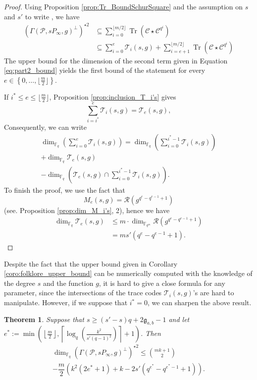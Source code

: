 \documentclass[journal]{IEEEtran}
\theoremstyle{plain}
\newtheorem{thm}{Theorem}[section]
\theoremstyle{definition}
\theoremstyle{remark}
\DeclareMathOperator{\trace}{Tr}
\newcommand{\calP}{\mathcal{P}}
\newcommand{\calC}{\mathcal{C}}
\newcommand{\calR}{\mathcal{R}}
\newcommand{\calT}{\mathcal{T}}
\newcommand{\fqm}{\mathbb{F}_{q^m}}
\newcommand{\fq}{\mathbb{F}_{q}}
\newcommand{\Tr}[1]{\trace\!\left(#1\right)}
\newcommand{\set}[1]{\left\{#1\right\}}
\begin{document}
	\begin{proof}
		Using Proposition \ref{prop:Tr_BoundSchurSquare} and the assumption on $s$ and $s'$ to write , we have
		\begin{align*}
			\left(\Gamma(\calP,sP_\infty,g)^{\perp}\right)^{\star 2}
			& \subseteq \sum\limits_{i=0}^{\lfloor m/2 \rfloor} \Tr{\calC \star                     \calC^{q^i}} \\
			& \subseteq \sum\limits_{i=0}^{e}\calT_i(s,g) + \sum\limits_{i=e+1}^{\lfloor m/2 \rfloor} \Tr{\calC \star \calC^{q^i}}
		\end{align*}
		The upper bound for the dimension of the second term given in Equation \eqref{eq:part2_bound} yields the first bound of the statement for every $e \in \set{0,\dots,\lfloor \frac{m}{2} \rfloor}$.
		
		\medskip
		
		If $i^* \leq e \leq \lfloor \frac{m}{2} \rfloor$,  Proposition \ref{prop:inclusion_T_i's} gives
		\[\sum\limits_{i=i^*}^e \calT_i(s,g) = \calT_e(s,g),\]
		Consequently, we can write 
		\begin{multline}
		\dim_{\fq} \left(\sum\limits_{i=0}^{e}\calT_i(s,g)\right) = \dim_{\fq} \left(\sum\limits_{i=0}^{i^*-1}\calT_i(s,g)\right) \\ + \dim_{\fq}\calT_e(s,g)  \\- \dim_{\fq} \left( \calT_e(s,g) \cap   \sum\limits_{i=0}^{i^*-1} \calT_i(s,g)\right).
		\end{multline}
		To finish the proof, we use the fact that 
		\[M_e(s,g) = \calR\left(g^{q^e-q^{e-1}+1}\right)\]
		(see. Proposition \ref{prop:dim_M_i's}, 2), hence we have
		\begin{align}
			\dim_{\fq}\calT_e(s,g) &\leq m \cdot \dim_{\fqm} \calR\left(g^{q^e-q^{e-1}+1}\right)\\ \label{eq:dimTe}
								   & = m s' (q^e-q^{e-1}+1).
		\end{align}
	\end{proof}
	
	Despite the fact that the upper bound given in Corollary \ref{coro:folklore_upper_bound} can be numerically computed with the knowledge of the degree $s$ and the function $g$, it is hard to give a close formula for any parameter, since the intersections of the trace codes $\calT_i(s,g)$'s are hard to manipulate. However, if we suppose that $i^*=0$, we can sharpen the above result.
	
	\begin{thm} \label{thm:bound_with_T_i's_inclusion} 
		Suppose that $s \geq (s'-s)q+2\mathfrak{g}_{a,b}-1$ and let $e^* := \min\left(\left\lfloor \frac{m}{2} \right\rfloor, \left\lceil \log_q\left(\frac{k^2}{s'(q-1)^2}\right)\right\rceil+1\right)$. Then
\begin{multline*}
		\dim_{\fq} (\Gamma(\calP,sP_\infty,g)^{\perp})^{\star 2}\leq \binom{mk+1}{2} \\- \dfrac{m}{2}(k^2(2e^*+1)+k-2s'(q^{e^*}-q^{e^*-1}+1)).
\end{multline*}		
	\end{thm}
	
\end{document}
